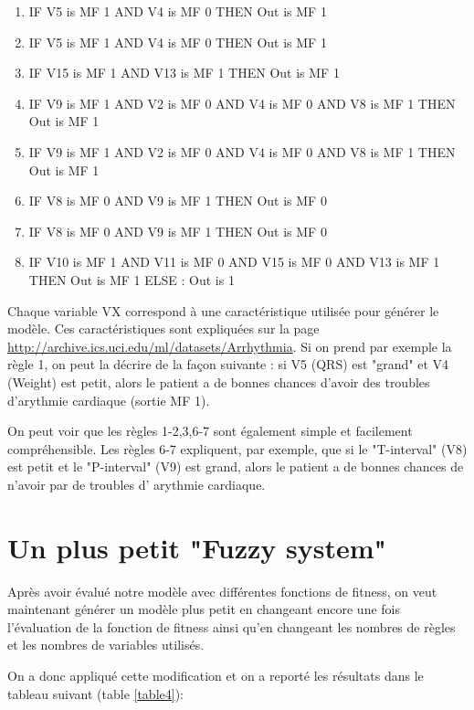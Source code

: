 \begin{enumerate}
  \item IF V5 is MF 1 AND V4 is MF 0 THEN Out is MF 1
  \item IF V5 is MF 1 AND V4 is MF 0 THEN Out is MF 1
  \item IF V15 is MF 1 AND V13 is MF 1 THEN Out is MF 1
  \item IF V9 is MF 1 AND V2 is MF 0 AND V4 is MF 0 AND V8 is MF 1 THEN Out is MF 1
  \item IF V9 is MF 1 AND V2 is MF 0 AND V4 is MF 0 AND V8 is MF 1 THEN Out is MF 1
  \item IF V8 is MF 0 AND V9 is MF 1 THEN Out is MF 0
  \item IF V8 is MF 0 AND V9 is MF 1 THEN Out is MF 0
  \item IF V10 is MF 1 AND V11 is MF 0 AND V15 is MF 0 AND V13 is MF 1 THEN Out is MF 1 ELSE : Out is 1  
\end{enumerate}

Chaque variable VX correspond à une caractéristique utilisée pour générer le modèle. Ces caractéristiques sont expliquées sur la page \url{http://archive.ics.uci.edu/ml/datasets/Arrhythmia}.
Si on prend par exemple la règle 1, on peut la décrire de la façon suivante : si V5 (QRS) est "grand" et V4 (Weight) est petit, alors le patient a de bonnes chances d'avoir des troubles d'arythmie cardiaque (sortie MF 1).

On peut voir que les règles 1-2,3,6-7 sont également simple et facilement compréhensible. 
Les règles 6-7 expliquent, par exemple, que si le "T-interval" (V8) est petit et le "P-interval" (V9) est grand, alors le patient a de bonnes chances de n'avoir par de troubles d' arythmie cardiaque.


\section*{Un plus petit "Fuzzy system"}

Après avoir évalué notre modèle avec différentes fonctions de fitness, on veut maintenant générer un modèle plus petit en changeant encore une fois l'évaluation de la fonction de fitness ainsi qu'en changeant les nombres de règles et les nombres de variables utilisés.

On a donc appliqué cette modification et on a reporté les résultats dans le tableau suivant (table \ref{table4}):
 
